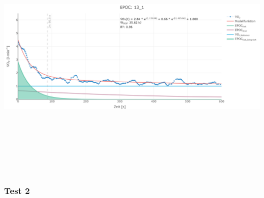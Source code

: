 \documentclass[
  letterpaper,
  DIV=11]{scrartcl}
\begin{document}
\includegraphics[width=11.45833in,height=4.6875in]{images/13_1.png}

\subsubsection{Test 2}
\end{document}
